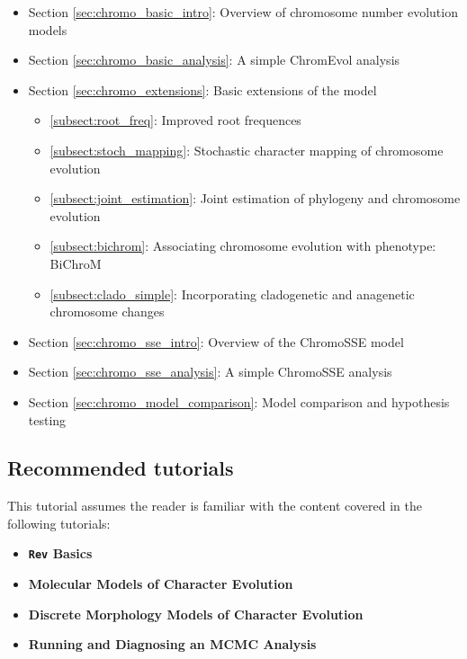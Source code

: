 \begin{itemize}
\item Section \ref{sec:chromo_basic_intro}: Overview of chromosome number evolution models
\item Section \ref{sec:chromo_basic_analysis}: A simple ChromEvol analysis
\item Section \ref{sec:chromo_extensions}: Basic extensions of the model
    \begin{itemize}
    \item \ref{subsect:root_freq}: Improved root frequences
    \item \ref{subsect:stoch_mapping}: Stochastic character mapping of chromosome evolution
    \item \ref{subsect:joint_estimation}: Joint estimation of phylogeny and chromosome evolution
    \item \ref{subsect:bichrom}: Associating chromosome evolution with phenotype: BiChroM
    \item \ref{subsect:clado_simple}: Incorporating cladogenetic and anagenetic chromosome changes
    \end{itemize}
\item Section \ref{sec:chromo_sse_intro}: Overview of the ChromoSSE model
\item Section \ref{sec:chromo_sse_analysis}: A simple ChromoSSE analysis
\item Section \ref{sec:chromo_model_comparison}: Model comparison and hypothesis testing 
\end{itemize}

\subsection*{Recommended tutorials}

This tutorial assumes the reader is familiar with the content covered in the following \RevBayes tutorials:

\begin{itemize}
\item {\bf {\tt \large Rev} Basics}
\item {\bf Molecular Models of Character Evolution}
\item {\bf Discrete Morphology Models of Character Evolution}
\item {\bf Running and Diagnosing an MCMC Analysis}
\end{itemize}

\newpage

